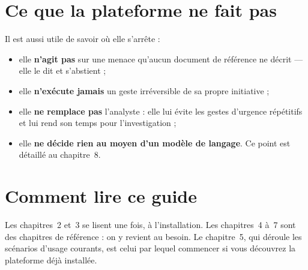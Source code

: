 \section*{Ce que la plateforme ne fait pas}

Il est aussi utile de savoir o\`u elle s'arr\^ete :

\begin{itemize}[leftmargin=*]
  \item elle \textbf{n'agit pas} sur une menace qu'aucun document de
        r\'ef\'erence ne d\'ecrit --- elle le dit et s'abstient ;
  \item elle \textbf{n'ex\'ecute jamais} un geste irr\'eversible de sa propre
        initiative ;
  \item elle \textbf{ne remplace pas} l'analyste : elle lui \'evite les gestes
        d'urgence r\'ep\'etitifs et lui rend son temps pour l'investigation ;
  \item elle \textbf{ne d\'ecide rien au moyen d'un mod\`ele de langage}. Ce
        point est d\'etaill\'e au chapitre~8.
\end{itemize}

\section*{Comment lire ce guide}

Les chapitres~2 et~3 se lisent une fois, \`a l'installation. Les chapitres~4
\`a~7 sont des chapitres de r\'ef\'erence : on y revient au besoin. Le
chapitre~5, qui d\'eroule les sc\'enarios d'usage courants, est celui par lequel
commencer si vous d\'ecouvrez la plateforme d\'ej\`a install\'ee.

